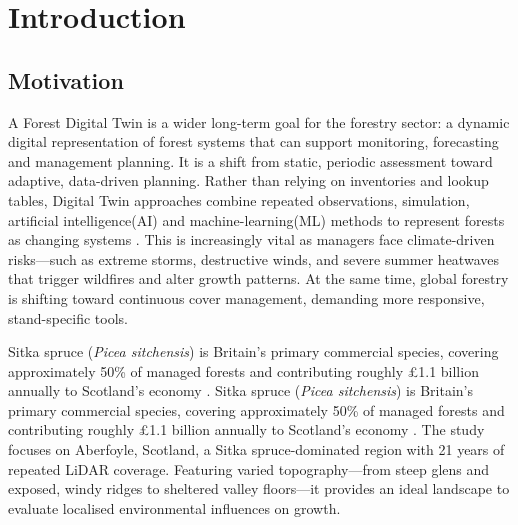 \documentclass[11pt,a4paper]{report}
\begin{document}
\newcommand{\fc}[1]{\textcolor{red}{[FactC: #1]}} 
\newcommand{\ct}[1]{\textcolor{orange}{[CITE: #1]}} 
\newcommand{\app}[1]{\textcolor{blue}{[APP: #1]}} 
\newcommand{\sr}[1]{\textcolor{teal}{[Sreword: #1]}}
\chapter{Introduction}
\section{Motivation}
A Forest Digital Twin is a wider long-term goal for the forestry sector: a dynamic digital representation of forest systems that can support monitoring, forecasting and management planning. It is a shift from static, periodic assessment toward adaptive, data-driven planning. Rather than relying on inventories and lookup tables, Digital Twin approaches combine repeated observations, simulation, artificial intelligence(AI) and machine-learning(ML) methods to represent forests as changing systems \cite{baskent2026Review_C1_SS}. This is increasingly vital as managers face climate-driven risks—such as extreme storms, destructive winds, and severe summer heatwaves that trigger wildfires and alter growth patterns. At the same time, global forestry is shifting toward continuous cover management, demanding more responsive, stand-specific tools.\cite{ForestResearch2009Evidence_C1_SS}

Sitka spruce (\textit{Picea sitchensis}) is Britain's primary commercial species, covering approximately 50\% of managed forests \cite{ForestResearch2026Sitka_C1_SS} and contributing roughly \pounds1.1 billion annually to Scotland's economy \cite{ScottishForestry2026Future_C1_SS, mason2011Sitka_C1_SS}. %
Sitka spruce (\textit{Picea sitchensis}) is Britain's primary commercial species, covering approximately 50\% of managed forests \cite{ForestResearch2026Sitka_C1_SS} and contributing roughly \pounds1.1 billion annually to Scotland's economy \cite{ScottishForestry2026Future_C1_SS, mason2011Sitka_C1_SS}. The study focuses on Aberfoyle, Scotland, a Sitka spruce-dominated region with 21 years of repeated LiDAR coverage. Featuring varied topography—from steep glens and exposed, windy ridges to sheltered valley floors—it provides an ideal landscape to evaluate localised environmental influences on growth.
\end{document}
